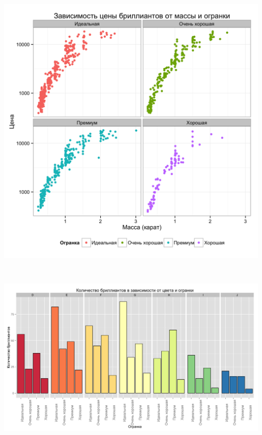 \documentclass[pdftex,12pt]{article}\usepackage[]{graphicx}\usepackage[]{color}
\makeatletter
\def\maxwidth{ %
  \ifdim\Gin@nat@width>\linewidth
    \linewidth
  \else
    \Gin@nat@width
  \fi
}
\newenvironment{knitrout}{}{} %
\makeatother
\begin{document}
\begin{knitrout}
\color{fgcolor}
\includegraphics[width=15cm,height=15cm]{figure/unnamed-chunk-6} 

\end{knitrout}

\begin{knitrout}
\color{fgcolor}
\includegraphics[width=\maxwidth]{figure/unnamed-chunk-7} 

\end{knitrout}
\end{document}
